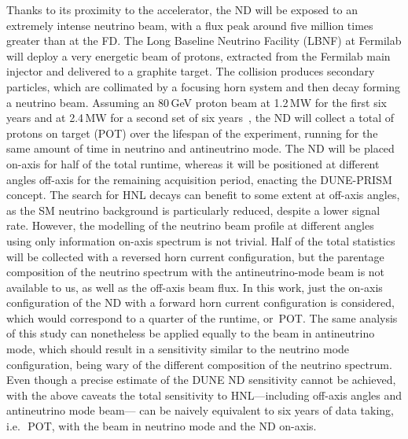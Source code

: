Thanks to its proximity to the accelerator, the ND will be exposed to an extremely intense neutrino beam, %
with a flux peak around five million times greater than at the FD.
The Long Baseline Neutrino Facility (LBNF) at Fermilab will deploy a very energetic beam of protons, %
extracted from the Fermilab main injector and delivered to a graphite target.
The collision produces secondary particles, which are collimated by a focusing horn system and then decay forming a neutrino beam.
Assuming an 80\,GeV proton beam at 1.2\,MW for the first six years and at 2.4\,MW for a second set of six years~\cite{Abi:2018dnh}, 
the ND will collect a total of  protons on target (POT) over the lifespan of the experiment, %
running for the same amount of time in neutrino and antineutrino mode.
The ND will be placed on-axis for half of the total runtime, whereas it will be positioned %
at different angles off-axis for the remaining acquisition period, enacting the DUNE-PRISM concept.
The search for HNL decays can benefit to some extent at off-axis angles, %
as the SM neutrino background is particularly reduced, despite a lower signal rate.
However, the modelling of the neutrino beam profile at different angles using only %
information on-axis spectrum is not trivial.
Half of the total statistics will be collected with a reversed horn current configuration, %
but the parentage composition of the neutrino spectrum with the antineutrino-mode beam is not available to us, %
as well as the off-axis beam flux.
In this work, just the on-axis configuration of the ND with a forward horn current configuration is considered, %
which would correspond to a quarter of the runtime, or \,POT.
The same analysis of this study can nonetheless be applied equally to the beam in antineutrino mode, %
which should result in a sensitivity similar to the neutrino mode configuration, %
being wary of the different composition of the neutrino spectrum.
Even though a precise estimate of the DUNE ND sensitivity cannot be achieved, %
with the above caveats the total sensitivity to HNL---including off-axis angles and antineutrino mode beam---%
can be naively equivalent to six years of data taking, i.e.\ \,POT, %
with the beam in neutrino mode and the ND on-axis.


